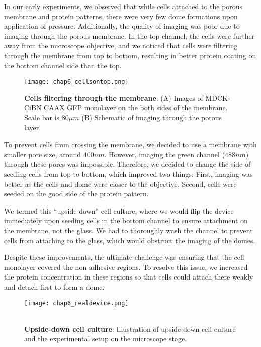 In our early experiments, we observed that while cells attached to the
porous membrane and protein patterns, there were very few dome
formations upon application of pressure. Additionally, the quality of
imaging was poor due to imaging through the porous membrane. In the top
channel, the cells were further away from the microscope objective, and
we noticed that cells were filtering through the membrane from top to
bottom, resulting in better protein coating on the bottom channel side
than the top.

\begin{figure}[h]
	\centering
	\texttt{[image: chap6\_cellsontop.png]}
	\caption{ \textbf{Cells filtering through the membrane}: (A) Images of MDCK-CiBN CAAX GFP monolayer on the both sides of the membrane. Scale bar is $80\mu m$ (B) Schematic of imaging through the porous layer.
	}\label{fig_6_4}
\end{figure}


To prevent cells from crossing the membrane, we decided to use a
membrane with smaller pore size, around \(400nm\). However, imaging the
green channel (\(488nm\)) through these pores was impossible. Therefore,
we decided to change the side of seeding cells from top to bottom, which
improved two things. First, imaging was better as the cells and dome
were closer to the objective. Second, cells were seeded on the good side
of the protein pattern.

We termed this ``upside-down'' cell culture, where we would flip the
device immediately upon seeding cells in the bottom channel to ensure
attachment on the membrane, not the glass. We had to thoroughly wash the
channel to prevent cells from attaching to the glass, which would
obstruct the imaging of the domes.

Despite these improvements, the ultimate challenge was ensuring that the
cell monolayer covered the non-adhesive regions. To resolve this issue,
we increased the protein concentration in these regions so that cells
could attach there weakly and detach first to form a dome.

\begin{figure}[h]
	\begin{minipage}[c]{0.7\textwidth}
		\texttt{[image: chap6\_realdevice.png]}
	\end{minipage}\hfill
	\begin{minipage}[c]{0.27\textwidth}
		\caption{\\ \textbf{Upside-down cell culture}: Illustration of upside-down cell culture and the experimental setup on the microscope stage.
		}\label{fig_6_5}
	\end{minipage}
\end{figure}

